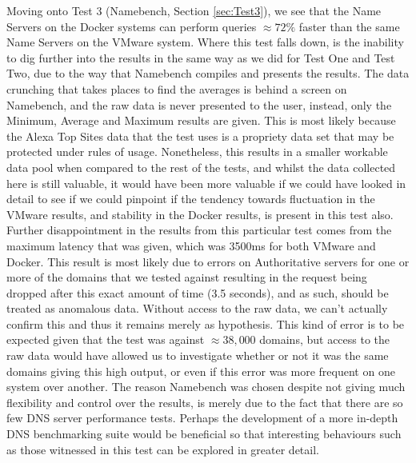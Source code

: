 Moving onto Test 3 (Namebench, Section \ref{sec:Test3}), we see that the Name Servers on the Docker systems can perform queries \(\approx72\%\) faster than the same Name Servers on the VMware system. Where this test falls down, is the inability to dig further into the results in the same way as we did for Test One and Test Two, due to the way that Namebench compiles and presents the results. The data crunching that takes places to find the averages is behind a screen on Namebench, and the raw data is never presented to the user, instead, only the Minimum, Average and Maximum results are given. This is most likely because the Alexa Top Sites data that the test uses is a propriety data set that may be protected under rules of usage. Nonetheless, this results in a smaller workable data pool when compared to the rest of the tests, and whilst the data collected here is still valuable, it would have been more valuable if we could have looked in detail to see if we could pinpoint if the tendency towards fluctuation in the VMware results, and stability in the Docker results, is present in this test also. Further disappointment in the results from this particular test comes from the maximum latency that was given, which was 3500ms for both VMware and Docker. This result is most likely due to errors on Authoritative servers for one or more of the domains that we tested against resulting in the request being dropped after this exact amount of time (3.5 seconds), and as such, should be treated as anomalous data. Without access to the raw data, we can't actually confirm this and thus it remains merely as hypothesis. This kind of error is to be expected given that the test was against \(\approx 38,000\) domains, but access to the raw data would have allowed us to investigate whether or not it was the same domains giving this high output, or even if this error was more frequent on one system over another. The reason Namebench was chosen despite not giving much flexibility and control over the results, is merely due to the fact that there are so few DNS server performance tests. Perhaps the development of a more in-depth DNS benchmarking suite would be beneficial so that interesting behaviours such as those witnessed in this test can be explored in greater detail.

